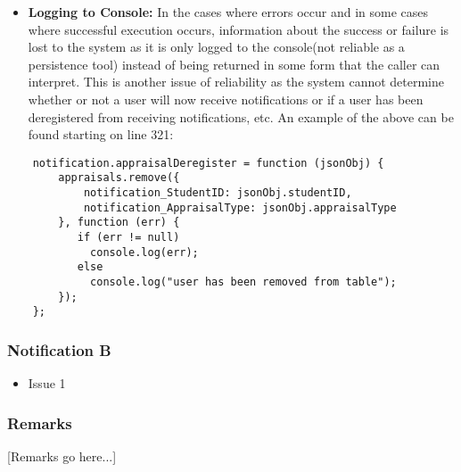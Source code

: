 \begin{itemize}
\item \textbf{Logging to Console:}\newline
     In the cases where errors occur and in some cases where successful execution occurs, information about the success or failure is lost to the system as it is only logged to the console(not reliable as a persistence tool) instead of being returned in some form that the caller can interpret. This is another issue of reliability as the system cannot determine whether or not a user will now receive notifications or if a user has been deregistered from receiving notifications, etc.
     An example of the above can be found starting on line 321: 
\end{itemize}
\begin{lstlisting}
    notification.appraisalDeregister = function (jsonObj) {
        appraisals.remove({
            notification_StudentID: jsonObj.studentID,
            notification_AppraisalType: jsonObj.appraisalType
        }, function (err) {
           if (err != null)
             console.log(err);
           else
             console.log("user has been removed from table");
        });
    };
\end{lstlisting}

\subsubsection*{Notification B}
\begin{itemize}
	\item Issue 1
\end{itemize}
\subsubsection*{Remarks}
[Remarks go here...]
